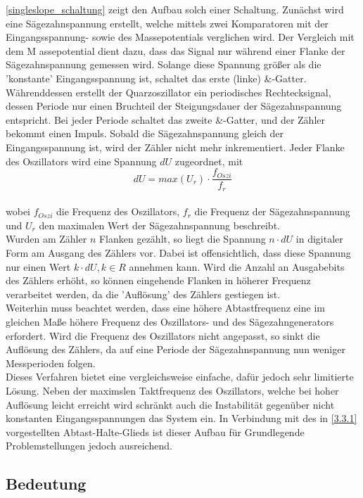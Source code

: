 \ref{singleslope_schaltung} zeigt den Aufbau solch einer Schaltung. Zunächst wird eine Sägezahnspannung erstellt, welche mittels zwei Komparatoren mit der Eingangsspannung- sowie des Massepotentials verglichen wird. Der Vergleich mit dem M	assepotential dient dazu, dass das Signal nur während einer Flanke der Sägezahnspannung gemessen wird. Solange diese Spannung größer als die 'konstante' Eingangsspannung ist, schaltet das erste (linke) \&-Gatter. Währenddessen erstellt der Quarzoszillator ein periodisches Rechtecksignal, dessen Periode nur einen Bruchteil der Steigungsdauer der Sägezahnspannung entspricht. Bei jeder Periode schaltet das zweite \&-Gatter, und der Zähler bekommt einen Impuls. Sobald die Sägezahnspannung gleich der Eingangsspannung ist, wird der Zähler nicht mehr inkrementiert. Jeder Flanke des Oszillators wird eine Spannung $dU$ zugeordnet, mit 
$$dU = max(U_r) \cdot \frac{f_{Oszi}}{f_r}$$\\
wobei $f_{Oszi}$ die Frequenz des Oszillators, $f_r$ die Frequenz der Sägezahnspannung und $U_r$ den maximalen Wert der Sägezahnspannung beschreibt.\\
Wurden am Zähler $n$ Flanken gezählt, so liegt die Spannung $n \cdot dU$ in digitaler Form am Ausgang des Zählers vor. Dabei ist offensichtlich, dass diese Spannung nur einen Wert $k \cdot dU, k \in R$ annehmen kann. Wird die Anzahl an Ausgabebits des 	Zählers erhöht, so können eingehende Flanken in höherer Frequenz verarbeitet werden, da die 'Auflösung' des Zählers gestiegen ist.\\
Weiterhin muss beachtet werden, dass eine höhere Abtastfrequenz eine im gleichen Maße höhere Frequenz des Oszillators- und des Sägezahngenerators erfordert. Wird die Frequenz des Oszillators nicht angepasst, so sinkt die Auflösung des Zählers, da auf eine Periode der Sägezahnspannung nun weniger Messperioden folgen.\\

Dieses Verfahren bietet eine vergleichsweise einfache, dafür jedoch sehr limitierte Lösung. Neben der maximslen Taktfrequenz des Oszillators, welche bei hoher Auflösung leicht erreicht wird schränkt auch die Instabilität gegenüber nicht konstanten Eingangsspannungen das System ein. In Verbindung mit des in \ref{3.3.1} vorgestellten Abtast-Halte-Glieds ist dieser Aufbau für Grundlegende Problemstellungen jedoch ausreichend.

\subsection{Bedeutung}\label{3.3}

